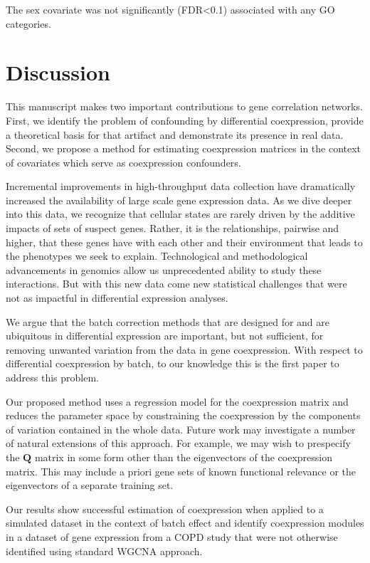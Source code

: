 The sex covariate was not significantly (FDR<0.1) associated with any GO categories.

\section*{Discussion}

This manuscript makes two important contributions to gene correlation
networks. First, we identify the problem of confounding by differential
coexpression, provide a theoretical basis for that artifact and demonstrate
its presence in real data. Second, we propose a method for estimating
coexpression matrices in the context of covariates which serve as
coexpression confounders. 

Incremental improvements in high-throughput data collection have dramatically
increased the availability of large scale gene expression data. As
we dive deeper into this data, we recognize that cellular states are
rarely driven by the additive impacts of sets of suspect genes. Rather,
it is the relationships, pairwise and higher, that these genes have
with each other and their environment that leads to the phenotypes
we seek to explain. Technological and methodological advancements
in genomics allow us unprecedented ability to study these interactions.
But with this new data come new statistical challenges that were not
as impactful in differential expression analyses. 

We argue that the batch correction methods that are designed for and
are ubiquitous in differential expression are important, but not sufficient,
for removing unwanted variation from the data in gene coexpression.  With respect to differential coexpression by batch, to our knowledge this is the first paper to address this problem.  

Our proposed method uses a regression model for the coexpression matrix and reduces the parameter space by constraining the coexpression by the components of variation contained in the whole data.  Future work may investigate a number of natural extensions of this approach.  For example, we may wish to prespecify the $\mathbf{Q}$ matrix in some form other than the eigenvectors of the coexpression matrix. This may include a priori gene sets of known functional relevance or the eigenvectors of a separate training set.

Our results show successful estimation of coexpression when applied to a simulated dataset in the context of batch effect and identify coexpression modules in a dataset of gene expression from a COPD study that were not otherwise identified using standard WGCNA approach.



